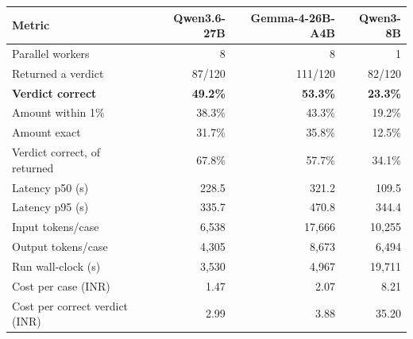 \begin{tabular}{@{}lrrr@{}}
\toprule
Metric & Qwen3.6-27B & Gemma-4-26B-A4B & Qwen3-8B \\
\midrule
Parallel workers & 8 & 8 & 1 \\
Returned a verdict & 87/120 & 111/120 & 82/120 \\
\textbf{Verdict correct} & \textbf{49.2\%} & \textbf{53.3\%} & \textbf{23.3\%} \\
Amount within 1\% & 38.3\% & 43.3\% & 19.2\% \\
Amount exact & 31.7\% & 35.8\% & 12.5\% \\
Verdict correct, of returned & 67.8\% & 57.7\% & 34.1\% \\
Latency p50 (s) & 228.5 & 321.2 & 109.5 \\
Latency p95 (s) & 335.7 & 470.8 & 344.4 \\
Input tokens/case & 6,538 & 17,666 & 10,255 \\
Output tokens/case & 4,305 & 8,673 & 6,494 \\
Run wall-clock (s) & 3,530 & 4,967 & 19,711 \\
Cost per case (INR) & 1.47 & 2.07 & 8.21 \\
Cost per correct verdict (INR) & 2.99 & 3.88 & 35.20 \\
\bottomrule
\end{tabular}
